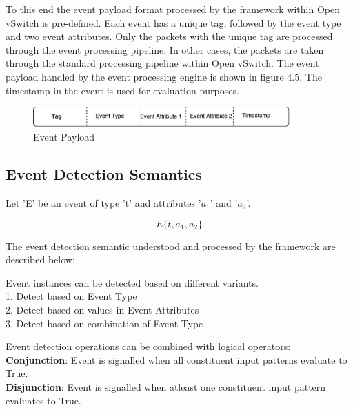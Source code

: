 To this end the event payload format processed by the framework within Open vSwitch is pre-defined. Each event has a unique tag,  followed by the event type and two event attributes. Only the packets with the unique tag are processed through the event processing pipeline. In other cases, the packets are taken through the standard processing pipeline within Open vSwitch. The event payload handled by the event processing engine is shown in figure 4.5. The timestamp in the event is used for evaluation purposes.

\begin{figure}[H]
 \centering
 \caption{Event Payload}
 \includegraphics[width=10cm]{payload.pdf}
\end{figure}

\subsection{Event Detection Semantics}
Let 'E' be an event of type 't' and attributes '$a_1$' and '$a_2$'.

\begin{equation}
E\lbrace t,a_1,a_2 \rbrace
\end{equation}

The event detection semantic understood and processed by the framework are described below:

\begin{flushleft}
 Event instances can be detected based on different variants.
 \\1. Detect based on Event Type
 \\2. Detect based on values in Event Attributes
 \\3. Detect based on combination of Event Type
 \\
\end{flushleft}
\begin{flushleft}
 Event detection operations can be combined with logical operators:
 \\
 \textbf{Conjunction}: Event is signalled when all constituent input patterns evaluate to True. 
 \\
 \textbf{Disjunction}: Event is signalled when atleast one constituent input pattern evaluates to True.
 \\

\end{flushleft}


